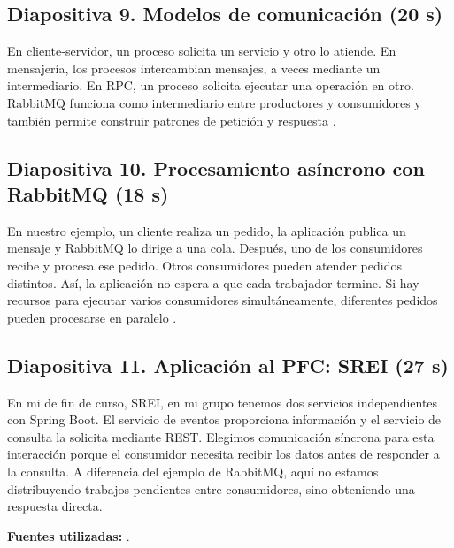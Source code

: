 \subsection*{Diapositiva 9. Modelos de comunicación (20 s)}
En cliente-servidor, un proceso solicita un servicio y otro
lo atiende. En mensajería, los procesos intercambian mensajes,
a veces mediante un intermediario. En RPC, un proceso solicita
ejecutar una operación en otro. RabbitMQ funciona como intermediario
entre productores y consumidores y también permite construir patrones de petición
y respuesta \cite{zhang2023,kazanavicius2023}.

\subsection*{Diapositiva 10. Procesamiento asíncrono con RabbitMQ (18 s)}
En nuestro ejemplo, un cliente realiza un pedido,
la aplicación publica un mensaje y RabbitMQ lo dirige a una
cola. Después, uno de los consumidores recibe y procesa ese pedido.
Otros consumidores pueden atender pedidos distintos. Así, la aplicación
no espera a que cada trabajador termine. Si hay recursos para ejecutar
varios consumidores simultáneamente, diferentes pedidos pueden procesarse en
paralelo \cite{maharjan2023,derlatka2023}.

\subsection*{Diapositiva 11. Aplicación al PFC: SREI (27 s)}
En mi de fin de curso, SREI, en mi grupo tenemos dos servicios independientes
con Spring Boot. El servicio de eventos proporciona información y el
servicio de consulta la solicita mediante REST.
Elegimos comunicación síncrona para esta interacción porque el
consumidor necesita recibir los datos antes de responder a la consulta.
A diferencia del ejemplo de RabbitMQ, aquí no estamos distribuyendo trabajos
pendientes entre consumidores, sino obteniendo una respuesta directa.

\textbf{Fuentes utilizadas:} \cite{ahmed2023,myrhorodskyi2025,rabbitmq2026quorum,kazanavicius2023,maharjan2023,derlatka2023,reinders2023,zhang2023}.